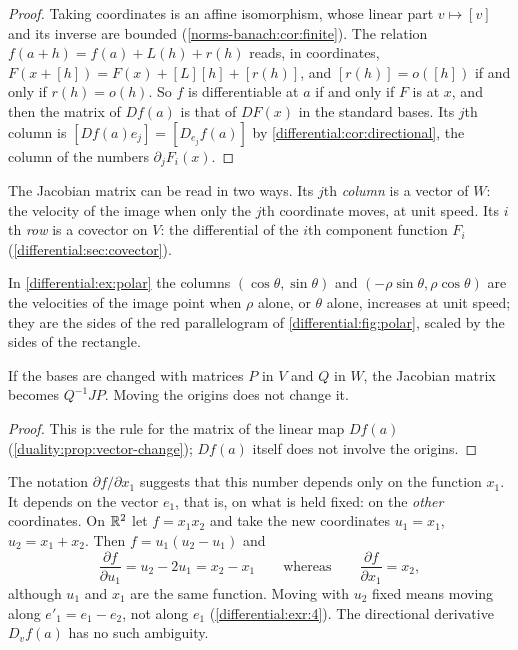 \begin{notechapter}
\begin{proof}
Taking coordinates is an affine isomorphism, whose linear part
$v\mapsto[v]$ and its inverse are bounded
(\cref{norms-banach:cor:finite}). The relation
$f(a + h) = f(a) + L(h) + r(h)$ reads, in coordinates,
$F(x + [h]) = F(x) + [L][h] + [r(h)]$, and $[r(h)] = o([h])$ if and only
if $r(h) = o(h)$. So $f$ is differentiable at $a$ if and only if $F$ is at
$x$, and then the matrix of $Df(a)$ is that of $DF(x)$ in the standard
bases. Its $j$th column is $[Df(a)e_j] = [D_{e_j}f(a)]$ by
\cref{differential:cor:directional}, the column of the numbers
$\partial_jF_i(x)$.
\end{proof}

\begin{intuition}
The Jacobian matrix can be read in two ways. Its $j$th \emph{column} is a
vector of $W$: the velocity of the image when only the $j$th coordinate
moves, at unit speed. Its $i$th \emph{row} is a covector on $V$: the
differential of the $i$th component function $F_i$
(\cref{differential:sec:covector}).
\end{intuition}

In \cref{differential:ex:polar} the columns
$(\cos\theta, \sin\theta)$ and $(-\rho\sin\theta, \rho\cos\theta)$ are the
velocities of the image point when $\rho$ alone, or $\theta$ alone,
increases at unit speed; they are the sides of the red parallelogram of
\cref{differential:fig:polar}, scaled by the sides of the rectangle.

\begin{corollary}\label{differential:cor:change}
If the bases are changed with matrices $P$ in $V$ and $Q$ in $W$, the
Jacobian matrix becomes $Q^{-1}JP$. Moving the origins does not change it.
\end{corollary}

\begin{proof}
This is the rule for the matrix of the linear map $Df(a)$
(\cref{duality:prop:vector-change}); $Df(a)$ itself does not involve the
origins.
\end{proof}

\begin{pitfall}
The notation $\partial f/\partial x_1$ suggests that this number depends
only on the function $x_1$. It depends on the vector $e_1$, that is, on
what is held fixed: on the \emph{other} coordinates. On $\mathbb{R}^2$ let
$f = x_1x_2$ and take the new coordinates $u_1 = x_1$,
$u_2 = x_1 + x_2$. Then $f = u_1(u_2 - u_1)$ and
\[
  \frac{\partial f}{\partial u_1} = u_2 - 2u_1 = x_2 - x_1
  \qquad\text{whereas}\qquad
  \frac{\partial f}{\partial x_1} = x_2 ,
\]
although $u_1$ and $x_1$ are the same function. Moving with $u_2$ fixed
means moving along $e'_1 = e_1 - e_2$, not along $e_1$
(\cref{differential:exr:4}). The directional derivative $D_vf(a)$ has no
such ambiguity.
\end{pitfall}


\end{notechapter}
